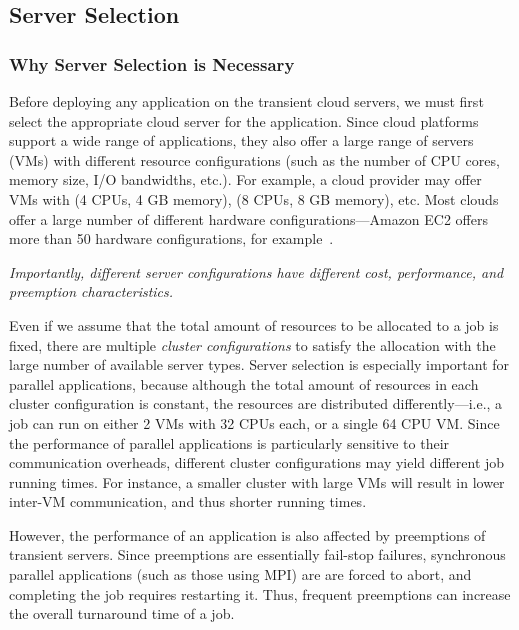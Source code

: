 \subsection{Server Selection}
\label{subsec:server-selection}

\subsubsection{Why Server Selection is Necessary}

Before deploying any application on the transient cloud servers, we must first select the appropriate cloud server for the application. 
Since cloud platforms support a wide range of applications, they also offer a large range of servers (VMs) with different resource configurations (such as the number of CPU cores, memory size, I/O bandwidths, etc.). 
For example, a cloud provider may offer VMs with (4 CPUs, 4 GB memory), (8 CPUs, 8 GB memory), etc.
Most clouds offer a large number of different hardware configurations---Amazon EC2 offers more than 50 hardware configurations, for example~\cite{amazon-ec2-instance-types}. 

\noindent \emph{Importantly, different server configurations have different cost, performance, and preemption characteristics. }


Even if we assume that the total amount of resources to be allocated to a job is fixed, there are multiple \emph{cluster configurations} to satisfy the allocation with the large number of available server types. 
Server selection is especially important for parallel applications, because although the total amount of resources in each cluster configuration is constant, the resources are distributed differently---i.e., a job can run on either 2 VMs with 32 CPUs each, or a single 64 CPU VM.  
Since the performance of parallel applications is particularly sensitive to their communication overheads, different cluster configurations may yield different job running times.
For instance, a smaller cluster with large VMs will result in lower inter-VM communication, and thus shorter running times. 

However, the performance of an application is also affected by preemptions of transient servers.
Since preemptions are essentially fail-stop failures, synchronous parallel applications (such as those using MPI) are 
are forced to  abort, and completing the job requires restarting it. 
Thus, frequent preemptions can increase the overall turnaround time of a job. 


